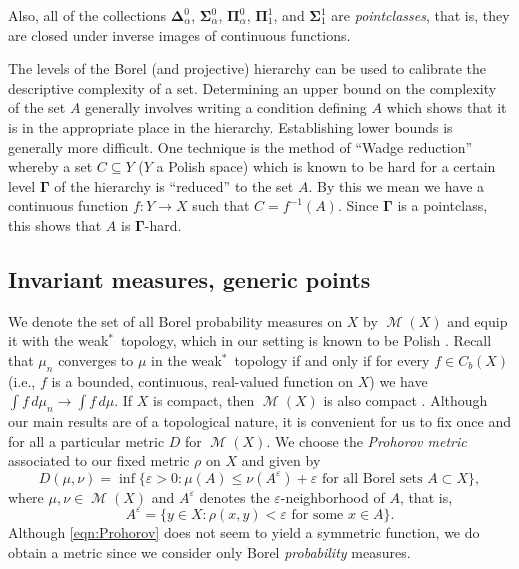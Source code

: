 \documentclass{amsart}
\theoremstyle{definition}
\newcommand{\bs}{\boldsymbol{\Sigma}}
\newcommand{\bp}{\boldsymbol{\Pi}}
\newcommand{\bG}{\boldsymbol{\Gamma}}
\newcommand{\bd}{\boldsymbol{\Delta}}
\DeclareMathOperator{\M}{\mathcal{M}}
\newcommand{\weakst}{weak$^*$}
\newcommand{\eps}{\varepsilon}
\begin{document}
Also, all of the collections
$\bd^0_\alpha$, $\bs^0_\alpha$, $\bp^0_\alpha$, $\bp^1_1$, and $\bs^1_1$ are {\em pointclasses}, that is, they are closed
under inverse images of continuous functions.



The levels of the Borel (and projective) hierarchy can be used
to calibrate the descriptive complexity of a set.
Determining an upper bound on the complexity of the set $A$ generally involves
writing a condition defining $A$
which shows that it is in the appropriate place in the hierarchy.
Establishing lower bounds is generally more difficult.
One technique is the method of ``Wadge
reduction'' whereby a set $C\subseteq Y$ ($Y$ a Polish space)
which is known to be hard for a certain
level $\bG$ of the hierarchy is ``reduced'' to the set $A$. By this we mean
we have a continuous function $f\colon Y\to X$ such that
$C=f^{-1}(A)$. Since $\bG$ is a pointclass, this shows that $A$
is $\bG$-hard.











\subsection{Invariant measures, generic points}
We denote the set of all Borel probability measures on $X$ by $\M(X)$ and equip it with the \weakst\ topology, which in our setting is known to be Polish
\cite[\S17.E]{Kechris}.
Recall that $\mu_n$ converges to $\mu$ in the \weakst\ topology
if and only if for every $f \in C_b(X)$
(i.e., $f$ is a bounded, continuous,
real-valued function on $X$) we have $\int f\, d\mu_n \to \int f\, d\mu$.
If $X$ is compact, then $\M(X)$ is also compact \cite[Theorem 17.22]{Kechris}.
Although our main results are of a topological nature, it is convenient for us to fix once
and for all a particular metric $D$ for $\M(X)$. We choose the \emph{Prohorov metric} associated to our fixed metric $\rho$ on $X$ and given by
\begin{equation}\label{eqn:Prohorov}
D(\mu,\nu)=%
\inf\{\eps>0: \mu(A)\le \nu(A^\eps)+\eps\text{ for all Borel sets }A\subset X\}, %
\end{equation}
where $\mu,\nu\in\M(X)$ and $A^\eps$ denotes the $\eps$-neighborhood of $A$, that is,
\[A^\eps=\{y\in X:\rho(x,y)<\eps\text{ for some }x\in A\}.\]
Although \eqref{eqn:Prohorov} does not seem to yield a symmetric function, we do obtain a metric since we consider only Borel \emph{probability} measures.
\end{document}
